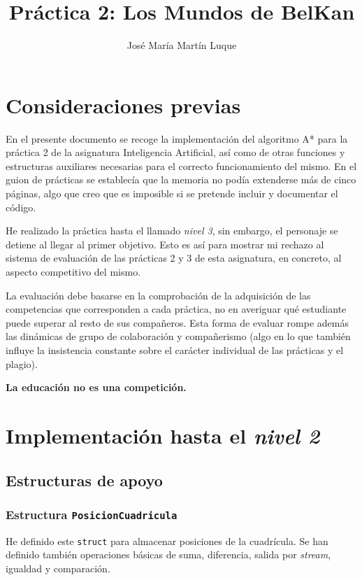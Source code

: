 \documentclass[11pt,a4paper]{article}
\title{Práctica 2: Los Mundos de BelKan}
\author{José María Martín Luque}
\begin{document}
\maketitle

\section*{Consideraciones previas}%
\label{sec:consideraciones_previas}

En el presente documento se recoge la implementación del algoritmo A* para la práctica 2 de la asignatura Inteligencia Artificial, así como de otras funciones y estructuras auxiliares necesarias para el correcto funcionamiento del mismo. En el guion de prácticas se establecía que la memoria no podía extenderse más de cinco páginas, algo que creo que es imposible si se pretende incluir y documentar el código.

He realizado la práctica hasta el llamado \textit{nivel 3}, sin embargo, el personaje se detiene al llegar al primer objetivo. Esto es así para mostrar mi rechazo al sistema de evaluación de las prácticas 2 y 3 de esta asignatura, en concreto, al aspecto competitivo del mismo.

La evaluación debe basarse en la comprobación de la adquisición de las competencias que corresponden a cada práctica, no en averiguar qué estudiante puede superar al resto de sus compañeros. Esta forma de evaluar rompe además las dinámicas de grupo de colaboración y compañerismo (algo en lo que también influye la insistencia constante sobre el carácter individual de las prácticas y el plagio).

\textbf{La educación no es una competición.}

\section{Implementación hasta el \textit{nivel 2}}

\subsection*{Estructuras de apoyo}

\subsubsection*{Estructura \texttt{PosicionCuadricula}}

He definido este \texttt{struct} para almacenar posiciones de la cuadrícula. Se han definido también operaciones básicas de suma, diferencia, salida por \textit{stream}, igualdad y comparación.
\end{document}
